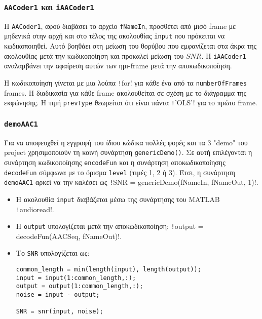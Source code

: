 \subsubsection{\texttt{AACoder1} και \texttt{iAACoder1}}
Η \texttt{AACoder1}, αφού διαβάσει το αρχείο \texttt{fNameIn}, προσθέτει από μισό frame με μηδενικά στην αρχή και στο τέλος της ακολουθίας \texttt{input} που πρόκειται να κωδικοποιηθεί.
Αυτό βοηθάει στη μείωση του θορύβου που εμφανίζεται στα άκρα της ακολουθίας μετά την κωδικοποίηση και προκαλεί μείωση του $SNR$.
Η \texttt{iAACoder1} αναλαμβάνει την αφαίρεση αυτών των ημι-frame μετά την αποκωδικοποίηση.

Η κωδικοποίηση γίνεται με μια λούπα \texttt!for! για κάθε ένα από τα \texttt{numberOfFrames} frames.
Η διαδικασία για κάθε frame ακολουθείται σε σχέση με το διάγραμμα της εκφώνησης.
Η τιμή \texttt{prevType} θεωρείται ότι είναι πάντα \texttt!'OLS'! για το πρώτο frame.

\subsubsection{\texttt{demoAAC1}}
Για να αποφευχθεί η εγγραφή του ίδιου κώδικα πολλές φορές και τα 3 "demo" του project χρησιμοποιούν τη κοινή συνάρτηση \texttt{genericDemo()}.
Σε αυτή επιλέγονται η συνάρτηση κωδικοποίησης \texttt{encodeFun} και η συνάρτηση αποκωδικοποίησης \texttt{decodeFun} σύμφωνα με το όρισμα \texttt{level} (τιμές 1, 2 ή 3).
Έτσι, η συνάρτηση \texttt{demoAAC1} αρκεί να την καλέσει ως \texttt!SNR = genericDemo(fNameIn, fNameOut, 1)!.

\begin{itemize}
\item Η ακολουθία \texttt{input} διαβάζεται μέσω της συνάρτησης του MATLAB \texttt!audioread!.

\item Η \texttt{output} υπολογίζεται μετά την αποκωδικοποίηση:
\texttt!output = decodeFun(AACSeq, fNameOut)!.

\item Το \texttt{SNR} υπολογίζεται ως:
\begin{verbatim}
common_length = min(length(input), length(output));
input = input(1:common_length,:);
output = output(1:common_length,:);
noise = input - output;

SNR = snr(input, noise);
\end{verbatim}
\end{itemize}

